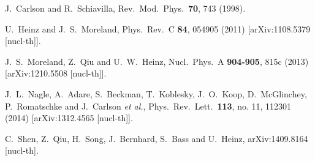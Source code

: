 \documentclass[preprint,showpacs,amsfonts,aps,prl,nofootinbib,floatfix]{revtex4}
\begin{document}
\begin{thebibliography}{99}
	
J.~Carlson and R.~Schiavilla,
Rev.\ Mod.\ Phys.\  {\bf 70}, 743 (1998).

U.~Heinz and J.~S.~Moreland,
Phys.\ Rev.\ C {\bf 84}, 054905 (2011)
[arXiv:1108.5379 [nucl-th]].

J.~S.~Moreland, Z.~Qiu and U.~W.~Heinz,
Nucl.\ Phys.\ A {\bf 904-905}, 815c (2013)
[arXiv:1210.5508 [nucl-th]].

J.~L.~Nagle, A.~Adare, S.~Beckman, T.~Koblesky, J.~O.~Koop, D.~McGlinchey, P.~Romatschke and J.~Carlson {\it et al.},
Phys.\ Rev.\ Lett.\  {\bf 113}, no. 11, 112301 (2014)
[arXiv:1312.4565 [nucl-th]].

C.~Shen, Z.~Qiu, H.~Song, J.~Bernhard, S.~Bass and U.~Heinz,
arXiv:1409.8164 [nucl-th].
  

\end{thebibliography}
\end{document}
